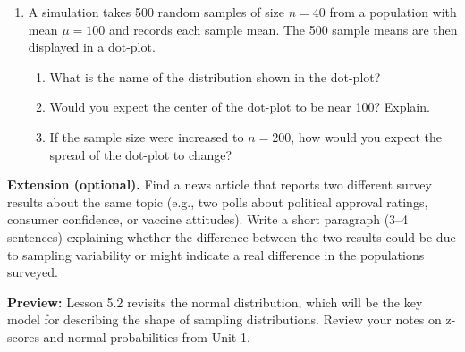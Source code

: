 \documentclass[10pt]{article}
\begin{document}
\begin{enumerate}
  \boxguard[8]
  \item A simulation takes 500 random samples of size $n = 40$ from a population with
        mean $\mu = 100$ and records each sample mean. The 500 sample means are then
        displayed in a dot-plot.

        \begin{enumerate}[label=\alph*.]
          \item What is the name of the distribution shown in the dot-plot?
                \makebox[7cm][l]{\vphantom{\blank{7cm}}\hspace{46bp}\smash{\gradedblank[id=hw3a, type=short, points=1, answer={sampling distribution of the sample mean}, check=text]{2.1in}{0.17in}}}
          \boxguard[17]
          \item Would you expect the center of the dot-plot to be near 100? Explain.
          \boxguard[17]
          \item If the sample size were increased to $n = 200$, how would you expect
                the spread of the dot-plot to change? 
        \end{enumerate}

\end{enumerate}

\begin{extensionbox}
\textbf{Extension (optional).} Find a news article that reports two different survey
results about the same topic (e.g., two polls about political approval ratings, consumer
confidence, or vaccine attitudes). Write a short paragraph (3--4 sentences) explaining
whether the difference between the two results could be due to sampling variability or
might indicate a real difference in the populations surveyed.
\end{extensionbox}

\begin{reflectionbox}
\textbf{Preview:} Lesson 5.2 revisits the normal distribution, which will be the key
model for describing the shape of sampling distributions. Review your notes on
z-scores and normal probabilities from Unit 1.
\end{reflectionbox}
\end{document}
